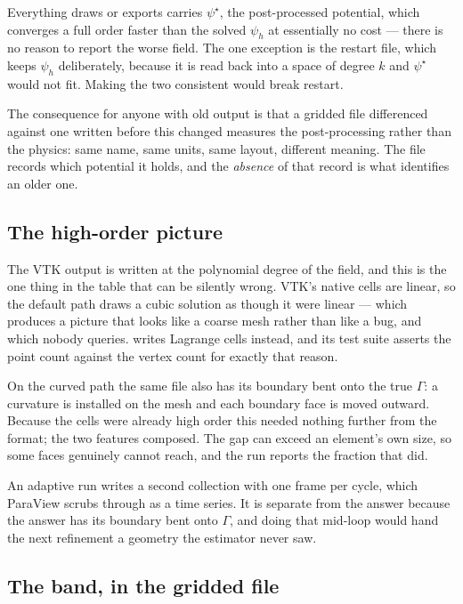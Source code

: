 Everything {\meq} draws or exports carries $\psi^{\star}$, the post-processed
potential, which converges a full order faster than the solved $\psi_h$ at
essentially no cost --- there is no reason to report the worse field. The one
exception is the restart file, which keeps $\psi_h$ deliberately, because it is
read back into a space of degree $k$ and $\psi^{\star}$ would not fit. Making
the two consistent would break restart.

The consequence for anyone with old output is that a gridded file differenced
against one written before this changed measures the post-processing rather than
the physics: same name, same units, same layout, different meaning. The file
records which potential it holds, and the \emph{absence} of that record is what
identifies an older one.

\subsection{The high-order picture}

The VTK output is written at the polynomial degree of the field, and this is the
one thing in the table that can be silently wrong. VTK's native cells are
linear, so the default path draws a cubic solution as though it were linear ---
which produces a picture that looks like a coarse mesh rather than like a bug,
and which nobody queries. {\meq} writes Lagrange cells instead, and its test
suite asserts the point count against the vertex count for exactly that reason.

On the curved path the same file also has its boundary bent onto the true
$\Gamma$: a curvature is installed on the mesh and each boundary face is moved
outward. Because the cells were already high order this needed nothing further
from the format; the two features composed. The gap can exceed an element's own
size, so some faces genuinely cannot reach, and the run reports the fraction
that did.

An adaptive run writes a second collection with one frame per cycle, which
ParaView scrubs through as a time series. It is separate from the answer because
the answer has its boundary bent onto $\Gamma$, and doing that mid-loop would
hand the next refinement a geometry the estimator never saw.

\subsection{The band, in the gridded file}
\label{sec:band}

